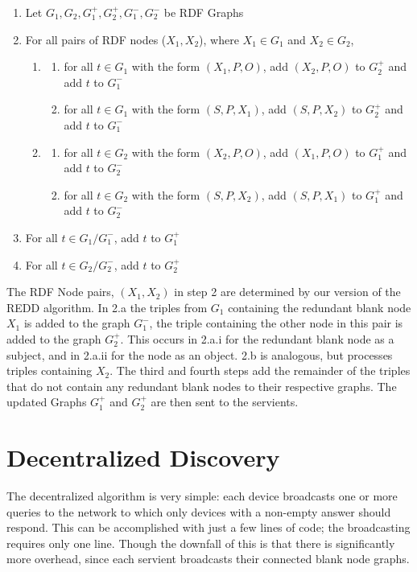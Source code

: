 \begin{enumerate}
    \item Let $G_1, G_2, G^+_1, G^+_2, G^-_1, G^-_2$ be RDF Graphs
    \item For all pairs of RDF nodes ($X_1, X_2$), where $X_1 \in G_1$ and $X_2 \in G_2$,
    \begin{enumerate}
    \item \begin{enumerate}
        \item for all $t \in G_1$ with the form $(X_1, P, O)$,    add $(X_2, P, O)$ to $G^+_2$ and add $t$ to $G^-_1$
        \item for all $t \in G_1$ with the form $(S, P, X_1)$,    add $(S, P, X_2)$ to $G^+_2$ and add $t$ to $G^-_1$
    \end{enumerate} \item \begin{enumerate}
        \item for all $t \in G_2$ with the form $(X_2, P, O)$,    add $(X_1, P, O)$ to $G^+_1$ and add $t$ to $G^-_2$
        \item for all $t \in G_2$ with the form $(S, P, X_2)$,    add $(S, P, X_1)$ to $G^+_1$ and add $t$ to $G^-_2$
    \end{enumerate}

    \end{enumerate}
    
    \item For all $t \in G_1/G^{-}_1$, add $t$ to $G^{+}_{1}$
    \item For all $t \in G_2/G^{-}_2$, add $t$ to $G^{+}_{2}$
\end{enumerate}

The RDF Node pairs, $(X_1, X_2)$ in step 2 are determined by our version of the REDD algorithm. In 2.a the triples from $G_1$ containing the redundant blank node $X_1$ is added to the graph $G^-_1$, the triple containing the other node in this pair is added to the graph $G^+_2$. This occurs in 2.a.i for the redundant blank node as a subject, and in 2.a.ii for the node as an object. 2.b is analogous, but processes triples containing $X_2$. The third and fourth steps add the remainder of the triples that do not contain any redundant blank nodes to their respective graphs. The updated Graphs $G^{+}_{1}$ and $G^{+}_{2}$ are then sent to the servients.

\section{Decentralized Discovery}
The decentralized algorithm is very simple: each device broadcasts one or more queries to the network to which only devices with a non-empty answer should respond. This can be accomplished with just a few lines of code; the broadcasting requires only one line. Though the downfall of this is that there is significantly more overhead, since each servient broadcasts their connected blank node graphs.

